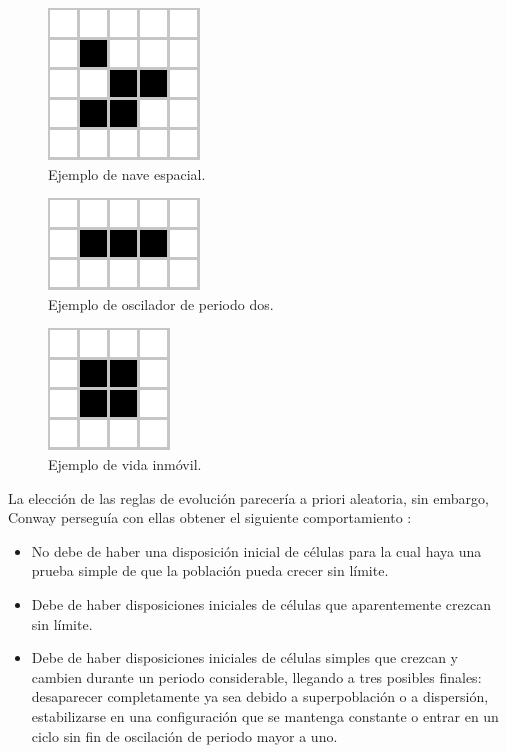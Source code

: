 \documentclass[../proyecto.tex]{book}
\begin{document}
\begin{figure}[H]
	\centering
	\includegraphics[height=.15\linewidth]{./images/glider.png}
	\caption{Ejemplo de nave espacial.}
	\label{fig:spaceship}
\end{figure} 
\begin{figure}[H]
	\centering
	\includegraphics[height=.125\linewidth]{./images/blinker.png}
	\caption{Ejemplo de oscilador de periodo dos.}
	\label{fig:blinker}
\end{figure} 
\begin{figure}[H]
	\centering
	\includegraphics[height=.15\linewidth]{./images/block.png}
	\caption{Ejemplo de vida inmóvil.}
	\label{fig:block}
\end{figure} 

La elección de las reglas de evolución parecería a priori aleatoria, sin embargo, Conway perseguía con ellas obtener el siguiente comportamiento \cite{libroGardner}:
\begin{itemize}
	\item No debe de haber una disposición inicial de células para la cual haya una prueba simple de que la población pueda crecer sin límite.
	\item Debe de haber disposiciones iniciales de células que aparentemente crezcan sin límite. 
	\item Debe de haber disposiciones iniciales de células simples que crezcan y cambien durante un periodo considerable, llegando a tres posibles finales: desaparecer completamente ya sea debido a superpoblación o a dispersión, estabilizarse en una configuración que se mantenga constante o entrar en un ciclo sin fin de oscilación de periodo mayor a uno.  
\end{itemize}
\end{document}
